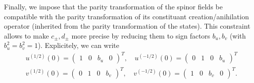 \documentclass[10pt, a4paper]{article}
\begin{document}
Finally, we impose that the parity transformation of the spinor fields be compatible with the parity transformation of its constituant creation/anihilation operator (inherited from the parity transformation of the states). This constraint allows to make $c_\pm, d_\pm$ more precise by reducing them to sign factors $b_u, b_v$ (with $b_u^2 = b_v^2 = 1$). Explicitely, we can write 
\begin{align*}
  &u^{(1/2)}(0) = 
  \begin{pmatrix}
    1& 0& b_u& 0
  \end{pmatrix}^T,\quad
   u^{(-1/2)}(0) = 
  \begin{pmatrix}
    0& 1& 0& b_u
  \end{pmatrix}^T\\
  &v^{(1/2)}(0) = 
  \begin{pmatrix}
    0& 1& 0& b_v
  \end{pmatrix}^T,\quad
   v^{(-1/2)}(0) = 
  \begin{pmatrix}
    1& 0& b_v& 0
  \end{pmatrix}^T.
\end{align*}
\newpage
\end{document}
